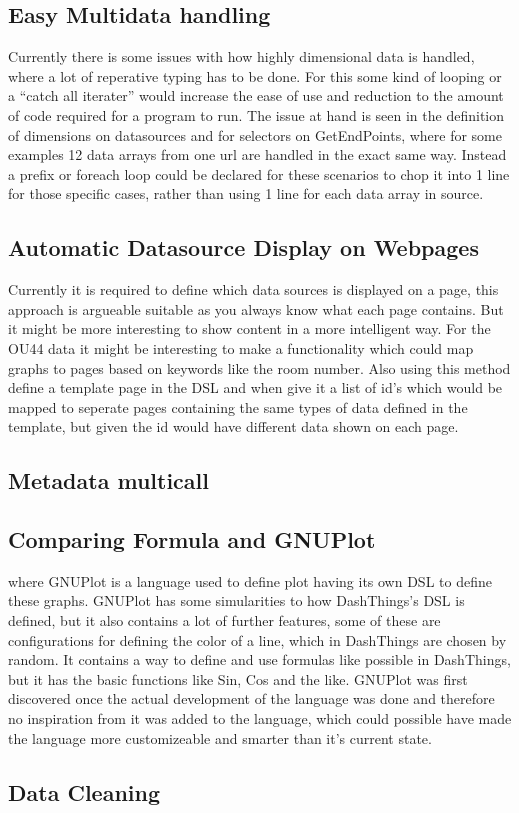 \subsection{Easy Multidata handling} Currently there is some issues with how highly dimensional data is handled, where a lot of reperative typing has to be done.
For this some kind of looping or a ``catch all iterater'' would increase the ease of use and
reduction to the amount of code required for a program to run. The issue at hand is seen in the
definition of dimensions on datasources and for selectors on GetEndPoints, where for some examples
12 data arrays from one url are handled in the exact same way. Instead a prefix or foreach loop
could be declared for these scenarios to chop it into 1 line for those specific cases, rather
than using 1 line for each data array in source.

\subsection{Automatic Datasource Display on Webpages} Currently it is required to define
which data sources is displayed on a page, this approach is argueable suitable as you always
know what each page contains. But it might be more interesting to show content in a more
intelligent way. For the OU44 data it might be interesting to make a functionality which could
map graphs to pages based on keywords like the room number. Also using this method define a
template page in the DSL and when give it a list of id's which would be mapped to seperate pages
containing the same types of data defined in the template, but given the id would have different
data shown on each page.

\subsection{Metadata multicall}

\subsection{Comparing Formula and GNUPlot} where GNUPlot is a language used to define
plot having its own DSL to define these graphs. GNUPlot has some simularities to how DashThings's
DSL is defined, but it also contains a lot of further features, some of these are configurations
for defining the color of a line, which in DashThings are chosen by random. It contains a way
to define and use formulas like possible in DashThings, but it has the basic functions like
Sin, Cos and the like. GNUPlot was first discovered once the actual development of the language
was done and therefore no inspiration from it was added to the language, which could possible have
made the language more customizeable and smarter than it's current state.

\subsection{Data Cleaning}